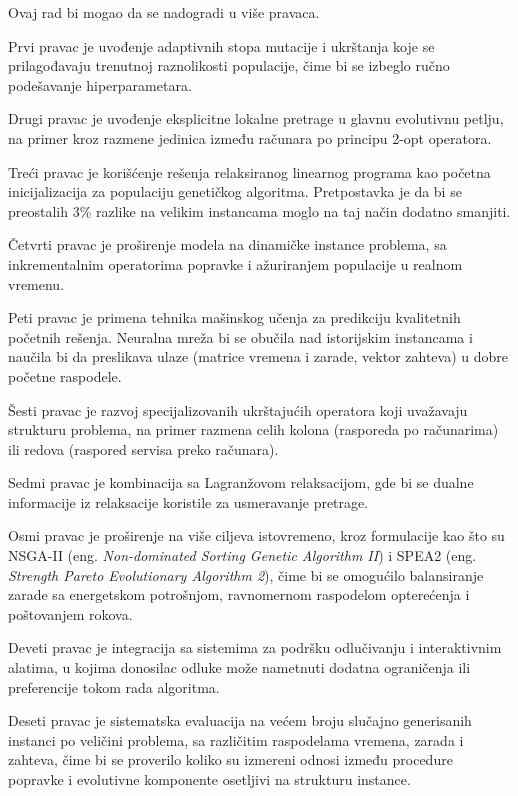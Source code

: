 \documentclass[12pt]{article}
\begin{document}
Ovaj rad bi mogao da se nadogradi u više pravaca.

Prvi pravac je uvođenje adaptivnih stopa mutacije i ukrštanja koje se prilagođavaju trenutnoj raznolikosti populacije, čime bi se izbeglo ručno podešavanje hiperparametara.

Drugi pravac je uvođenje eksplicitne lokalne pretrage u glavnu evolutivnu petlju, na primer kroz razmene jedinica između računara po principu 2-opt operatora.

Treći pravac je korišćenje rešenja relaksiranog linearnog programa kao početna inicijalizacija za populaciju genetičkog algoritma. Pretpostavka je da bi se preostalih 3\% razlike na velikim instancama moglo na taj način dodatno smanjiti.

Četvrti pravac je proširenje modela na dinamičke instance problema, sa inkrementalnim operatorima popravke i ažuriranjem populacije u realnom vremenu.

Peti pravac je primena tehnika mašinskog učenja za predikciju kvalitetnih početnih rešenja. Neuralna mreža bi se obučila nad istorijskim instancama i naučila bi da preslikava ulaze (matrice vremena i zarade, vektor zahteva) u dobre početne raspodele.

Šesti pravac je razvoj specijalizovanih ukrštajućih operatora koji uvažavaju strukturu problema, na primer razmena celih kolona (rasporeda po računarima) ili redova (raspored servisa preko računara).

Sedmi pravac je kombinacija sa Lagranžovom relaksacijom, gde bi se dualne informacije iz relaksacije koristile za usmeravanje pretrage.

Osmi pravac je proširenje na više ciljeva istovremeno, kroz formulacije kao što su NSGA-II (eng. \textit{Non-dominated Sorting Genetic Algorithm II}) i SPEA2 (eng. \textit{Strength Pareto Evolutionary Algorithm 2}), čime bi se omogućilo balansiranje zarade sa energetskom potrošnjom, ravnomernom raspodelom opterećenja i poštovanjem rokova.

Deveti pravac je integracija sa sistemima za podršku odlučivanju i interaktivnim alatima, u kojima donosilac odluke može nametnuti dodatna ograničenja ili preferencije tokom rada algoritma.

Deseti pravac je sistematska evaluacija na većem broju slučajno generisanih instanci po veličini problema, sa različitim raspodelama vremena, zarada i zahteva, čime bi se proverilo koliko su izmereni odnosi između procedure popravke i evolutivne komponente osetljivi na strukturu instance.
\end{document}
